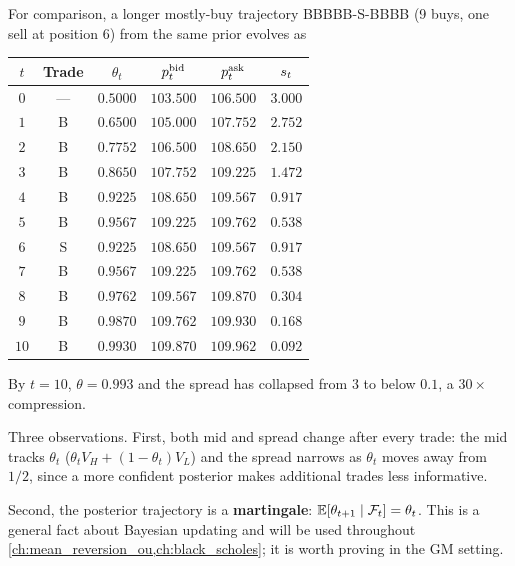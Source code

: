 For comparison, a longer mostly-buy trajectory BBBBB-S-BBBB (9
buys, one sell at position 6) from the same prior evolves as

\begin{center}
\begin{tabular}{cccccc}
\toprule
$t$ & Trade & $\theta_t$ & $p^{\mathrm{bid}}_t$ & $p^{\mathrm{ask}}_t$ & $s_t$ \\
\midrule
$0$  & ---   & $0.5000$ & $103.500$ & $106.500$ & $3.000$ \\
$1$  & B     & $0.6500$ & $105.000$ & $107.752$ & $2.752$ \\
$2$  & B     & $0.7752$ & $106.500$ & $108.650$ & $2.150$ \\
$3$  & B     & $0.8650$ & $107.752$ & $109.225$ & $1.472$ \\
$4$  & B     & $0.9225$ & $108.650$ & $109.567$ & $0.917$ \\
$5$  & B     & $0.9567$ & $109.225$ & $109.762$ & $0.538$ \\
$6$  & S     & $0.9225$ & $108.650$ & $109.567$ & $0.917$ \\
$7$  & B     & $0.9567$ & $109.225$ & $109.762$ & $0.538$ \\
$8$  & B     & $0.9762$ & $109.567$ & $109.870$ & $0.304$ \\
$9$  & B     & $0.9870$ & $109.762$ & $109.930$ & $0.168$ \\
$10$ & B     & $0.9930$ & $109.870$ & $109.962$ & $0.092$ \\
\bottomrule
\end{tabular}
\end{center}

By $t = 10$, $\theta = 0.993$ and the spread has collapsed from
$3$ to below $0.1$, a $30\times$ compression.

Three observations. First, both mid and spread change after every
trade: the mid tracks $\theta_t$ ($\theta_t V_H + (1-\theta_t)V_L$)
and the spread narrows as $\theta_t$ moves away from $1/2$, since
a more confident posterior makes additional trades less
informative.

Second, the posterior trajectory is a \textbf{martingale}:
$\mathbb{E}[\theta_{t+1} \mid \mathcal{F}_t] = \theta_t$. This is a general
fact about Bayesian updating and will be used throughout
\cref{ch:mean_reversion_ou,ch:black_scholes}; it is worth proving
in the GM setting.

